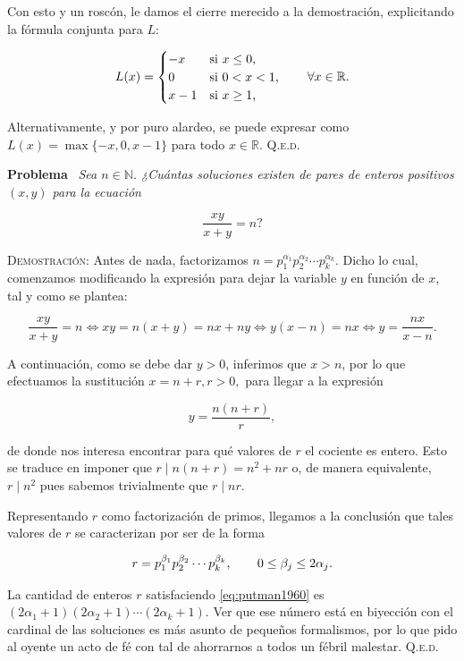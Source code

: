 \documentclass{article}
\begin{document}
Con esto y un roscón, le damos el cierre merecido a la demostración, explicitando la fórmula conjunta para $L$:

\[
L(x) =
\begin{cases}
    -x & \text{si $x \leq 0$,} \\
    0 & \text{si $0 < x < 1$,} \\
    x - 1 & \text{si $x \geq 1$,}
\end{cases}
\hspace{20px} \forall x \in \mathbb{R}.
\]

\noindent Alternativamente, y por puro alardeo, se puede expresar como $L(x) = \max\{-x, 0, x - 1\}$ para todo $x \in \mathbb{R}$. \hfill{\textsc{Q.e.d.}}

\vspace{12px}

\noindent\textbf{Problema} \, \textit{Sea $n \in \mathbb{N}$. ¿Cuántas soluciones existen de pares de enteros positivos $(x, y)$ para la ecuación} 

\[\frac{xy}{x+y} = n\textit{?}\]

\noindent\textsc{Demostración}: Antes de nada, factorizamos $n = p_1^{\alpha_1}p_2^{\alpha_2}\cdots p_k^{\alpha_k}$. Dicho lo cual, comenzamos modificando la expresión para dejar la variable $y$ en función de $x$, tal y como se plantea:

\[\frac{xy}{x+y} = n \iff xy = n(x+y) = nx + ny \iff y(x-n) = nx \iff y = \frac{nx}{x-n}.\]

A continuación, como se debe dar $y > 0$, inferimos que $x > n$, por lo que efectuamos la sustitución $x = n + r, r > 0,$ para llegar a la expresión

\[y = \frac{n(n+r)}{r},\]

\noindent de donde nos interesa encontrar para qué valores de $r$ el cociente es entero. Esto se traduce en imponer que $r \mid n(n+r) = n^2 + nr$ o, de manera equivalente, $r \mid n^2$ pues sabemos trivialmente que $r \mid nr$.

Representando $r$ como factorización de primos, llegamos a la conclusión que tales valores de $r$ se caracterizan por ser de la forma

\begin{equation}
    r = p_1^{\beta_1}p_2^{\beta_2}\cdots p_k^{\beta_k}, \hspace{20px} 0 \leq \beta_j \leq 2\alpha_j.
    \label{eq:putman1960}
\end{equation}

\noindent La cantidad de enteros $r$ satisfaciendo \eqref{eq:putman1960} es $(2\alpha_1 + 1)(2\alpha_2 + 1)\cdots(2\alpha_k + 1)$. Ver que ese número está en biyección con el cardinal de las soluciones es más asunto de pequeños formalismos, por lo que pido al oyente un acto de fé con tal de ahorrarnos a todos un fébril malestar. \hfill{\textsc{Q.e.d.}}
\end{document}

